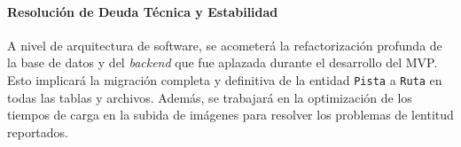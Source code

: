 \paragraph{Resolución de Deuda Técnica y Estabilidad}
A nivel de arquitectura de software, se acometerá la refactorización profunda de la base de datos y del \textit{backend} que fue aplazada durante el desarrollo del MVP. Esto implicará la migración completa y definitiva de la entidad \texttt{Pista} a \texttt{Ruta} en todas las tablas y archivos. Además, se trabajará en la optimización de los tiempos de carga en la subida de imágenes para resolver los problemas de lentitud reportados.